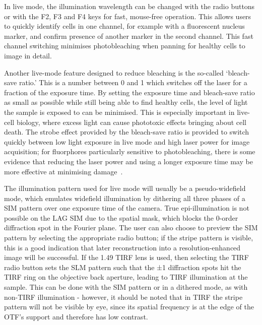 In live mode, the illumination wavelength can be changed with the radio buttons or with the F2, F3 and F4 keys for fast, mouse-free operation.
This allows users to quickly identify cells in one channel, for example with a fluorescent nucleus marker, and confirm presence of another marker in the second channel.
This fast channel switching minimises photobleaching when panning for healthy cells to image in detail.

Another live-mode feature designed to reduce bleaching is the so-called `bleach-save ratio.'
This is a number between 0 and 1 which switches off the laser for a fraction of the exposure time.
By setting the exposure time and bleach-save ratio as small as possible while still being able to find healthy cells, the level of light the sample is exposed to can be minimised.
This is especially important in live-cell biology, where excess light can cause phototoxic effects bringing about cell death.
The strobe effect provided by the bleach-save ratio is provided to switch quickly between low light exposure in live mode and high laser power for image acquisition; for fluorphores particularly sensitive to photobleaching, there is some evidence that reducing the laser power and using a longer exposure time may be more effective at minimising damage~\cite{mubaid2017less}. 

The illumination pattern used for live mode will usually be a pseudo-widefield mode, which emulates widefield illumination by dithering all three phases of a SIM pattern over one exposure time of the camera.
True epi-illumination is not possible on the LAG SIM due to the spatial mask, which blocks the 0-order diffraction spot in the Fourier plane.
The user can also choose to preview the SIM pattern by selecting the appropriate radio button; if the stripe pattern is visible, this is a good indication that later reconstruction into a resolution-enhanced image will be successful.
If the \SI{1.49}{\numaperture} TIRF lens is used, then selecting the TIRF radio button sets the SLM pattern such that the ±1 diffraction spots hit the TIRF ring on the objective back aperture, leading to TIRF illumination at the sample.
This can be done with the SIM pattern or in a dithered mode, as with non-TIRF illumination - however, it should be noted that in TIRF the stripe pattern will not be visible by eye, since its spatial frequency is at the edge of the OTF's support and therefore has low contrast.

